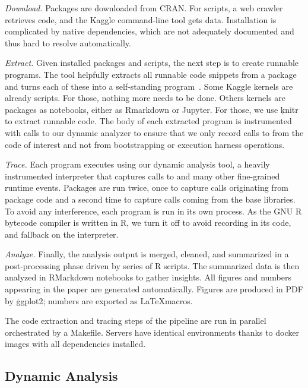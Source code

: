\documentclass[review,screen,acmsmall,anonymous=true]{acmart}
\begin{document}
\medskip
\begin{compactenum}
\item \emph{Download.} Packages are downloaded from CRAN. For scripts, a web
  crawler retrieves code, and the Kaggle command-line tool gets data.
  Installation is complicated by native dependencies, which are not adequately
  documented and thus hard to resolve automatically.
\item \emph{Extract.} Given installed packages and scripts, the next step is to
  create runnable programs. The \genthat tool helpfully extracts all runnable
  code snippets from a package and turns each of these into a self-standing
  program~\cite{issta18}. Some Kaggle kernels are already scripts. For those,
  nothing more needs to be done. Others kernels are packages as notebooks, either   as Rmarkdown or Jupyter. For those, we use \c{knitr} to extract
   runnable code.
  The body of each extracted program is instrumented with calls to our dynamic
  analyzer to ensure that we only record calls to \eval from the code of
  interest and not from bootstrapping or execution harness operations.
\item \emph{Trace.} Each program executes using our dynamic analysis tool, a heavily instrumented interpreter that captures calls to \eval and
  many other fine-grained runtime events. Packages are run twice, once to
  capture \eval calls originating from package code and a second time to
  capture calls coming from the base libraries. To avoid any interference, each
  program is run in its own process.
  As the GNU R bytecode compiler is written in R, we turn it off
  to avoid recording \eval in its code, and fallback on the interpreter.
\item \emph{Analyze.} Finally, the analysis output is merged, cleaned, and summarized
  in a post-processing phase driven by series of R scripts. The summarized data
  is then analyzed in RMarkdown notebooks to gather insights. All figures and
  numbers appearing in the paper are generated automatically. Figures are
  produced in PDF by \c{ggplot2}; numbers are exported as \LaTeX macros.
\end{compactenum}

\medskip\noindent The code extraction and tracing steps of the pipeline are run
in parallel~\cite{GNUparallel} orchestrated by a Makefile. Servers have
identical environments thanks to docker images with all dependencies installed.

\subsection{Dynamic Analysis}
\end{document}

